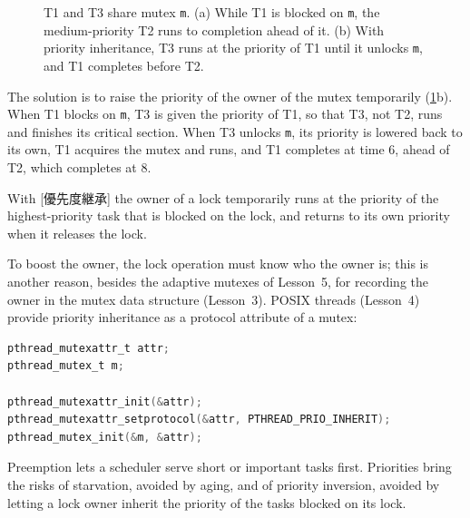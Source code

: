 \documentclass[../main.tex]{subfiles}
\begin{document}
\begin{figure}[htbp]
  \centering
  
  \caption{T1 and T3 share mutex \texttt{m}.  (a) While T1 is blocked on
    \texttt{m}, the medium-priority T2 runs to completion ahead of it.
    (b) With priority inheritance, T3 runs at the priority of T1 until it
    unlocks \texttt{m}, and T1 completes before T2.}
  \label{fig:l07-inversion}
\end{figure}

The solution is to raise the priority of the owner of the mutex temporarily
(\cref{fig:l07-inversion}b).  When T1 blocks on \texttt{m}, T3 is given the
priority of T1, so that T3, not T2, runs and finishes its critical section.
When T3 unlocks \texttt{m}, its priority is lowered back to its own, T1
acquires the mutex and runs, and T1 completes at time 6, ahead of T2,
which completes at 8.

\begin{definition}
  With [優先度継承] the owner of a lock
  temporarily runs at the priority of the highest-priority task that is
  blocked on the lock, and returns to its own priority when it releases the
  lock.
\end{definition}

To boost the owner, the lock operation must know who the owner is; this is
another reason, besides the adaptive mutexes of Lesson~5, for recording the
owner in the mutex data structure (Lesson~3).  POSIX threads (Lesson~4)
provide priority inheritance as a protocol attribute of a
mutex:
\begin{lstlisting}[language=C, numbers=none]
pthread_mutexattr_t attr;
pthread_mutex_t m;

pthread_mutexattr_init(&attr);
pthread_mutexattr_setprotocol(&attr, PTHREAD_PRIO_INHERIT);
pthread_mutex_init(&m, &attr);
\end{lstlisting}

\begin{keypoint}
  Preemption lets a scheduler serve short or important tasks first.
  Priorities bring the risks of starvation, avoided by aging, and of
  priority inversion, avoided by letting a lock owner inherit the priority
  of the tasks blocked on its lock.
\end{keypoint}
\end{document}
